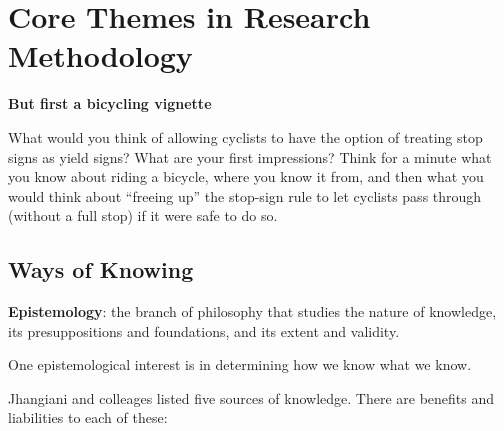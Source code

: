 \documentclass[
  english,
]{book}
\begin{document}
\hypertarget{core-themes-in-research-methodology}{%
\section{Core Themes in Research Methodology}\label{core-themes-in-research-methodology}}

\textbf{But first a bicycling vignette}

What would you think of allowing cyclists to have the option of treating stop signs as yield signs? What are your first impressions? Think for a minute what you know about riding a bicycle, where you know it from, and then what you would think about ``freeing up'' the stop-sign rule to let cyclists pass through (without a full stop) if it were safe to do so.

\hypertarget{ways-of-knowing}{%
\subsection{Ways of Knowing}\label{ways-of-knowing}}

\textbf{Epistemology}: the branch of philosophy that studies the nature of knowledge, its presuppositions and foundations, and its extent and validity.

One epistemological interest is in determining how we know what we know.

Jhangiani \citeyearpar{jhangiani_research_2019} and colleages listed five sources of knowledge. There are benefits and liabilities to each of these:
\end{document}
